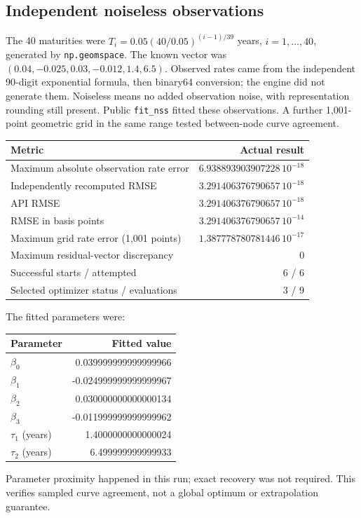 \documentclass[12pt,a4paper]{article}
\begin{document}
\subsection{Independent noiseless observations}
The 40 maturities were
$T_i=0.05(40/0.05)^{(i-1)/39}$ years, $i=1,\ldots,40$, generated by
\texttt{np.geomspace}. The known vector was
$(0.04,-0.025,0.03,-0.012,1.4,6.5)$.
Observed rates came from the independent 90-digit exponential formula,
then binary64 conversion; the engine did not generate them.
Noiseless means no added observation noise, with representation rounding
still present. Public \texttt{fit\_nss} fitted these observations.
A further 1,001-point geometric grid in the same range tested between-node
curve agreement.
\begin{center}\small
\begin{tabular}{@{}lr@{}}
\toprule
Metric & Actual result\\
\midrule
Maximum absolute observation rate error & $6.938893903907228\,10^{-18}$\\
Independently recomputed RMSE & $3.291406376790657\,10^{-18}$\\
API RMSE & $3.291406376790657\,10^{-18}$\\
RMSE in basis points & $3.291406376790657\,10^{-14}$\\
Maximum grid rate error (1,001 points) & $1.387778780781446\,10^{-17}$\\
Maximum residual-vector discrepancy & 0\\
Successful starts / attempted & 6 / 6\\
Selected optimizer status / evaluations & 3 / 9\\
\bottomrule
\end{tabular}
\end{center}
The fitted parameters were:
\begin{center}\small
\begin{tabular}{@{}lr@{}}
\toprule
Parameter & Fitted value\\
\midrule
$\beta_0$ & 0.039999999999999966\\
$\beta_1$ & -0.024999999999999967\\
$\beta_2$ & 0.030000000000000134\\
$\beta_3$ & -0.011999999999999962\\
$\tau_1$ (years) & 1.4000000000000024\\
$\tau_2$ (years) & 6.499999999999933\\
\bottomrule
\end{tabular}
\end{center}
Parameter proximity happened in this run; exact recovery was not required.
This verifies sampled curve agreement, not a global optimum or
extrapolation guarantee.
\end{document}

